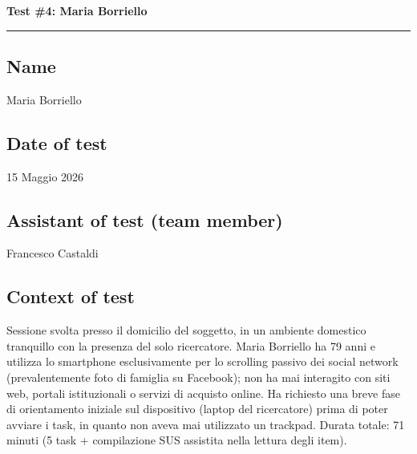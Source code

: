 ﻿\documentclass[11pt,a4paper]{article}
\begin{document}
\newpage
\begin{center}
  {\color{primaryColor}\large\bfseries Test \#4: Maria Borriello}\\
  \vspace{0.1cm}
  \color{borderColor}\hrule
\end{center}

\vspace{0.5cm}

\subsection*{Name}
\begin{tcolorbox}[base]
Maria Borriello
\end{tcolorbox}

\subsection*{Date of test}
\begin{tcolorbox}[base]
15 Maggio 2026
\end{tcolorbox}

\subsection*{Assistant of test (team member)}
\begin{tcolorbox}[base]
Francesco Castaldi
\end{tcolorbox}

\subsection*{Context of test}
\begin{tcolorbox}[base]
Sessione svolta presso il domicilio del soggetto, in un
ambiente domestico tranquillo con la presenza del solo
ricercatore. Maria Borriello ha 79 anni e utilizza lo
smartphone esclusivamente per lo scrolling passivo dei
social network (prevalentemente foto di famiglia su
Facebook); non ha mai interagito con siti web, portali
istituzionali o servizi di acquisto online. Ha richiesto
una breve fase di orientamento iniziale sul dispositivo
(laptop del ricercatore) prima di poter avviare i task,
in quanto non aveva mai utilizzato un trackpad. Durata
totale: 71 minuti (5 task + compilazione SUS assistita
nella lettura degli item).
\end{tcolorbox}
\end{document}
